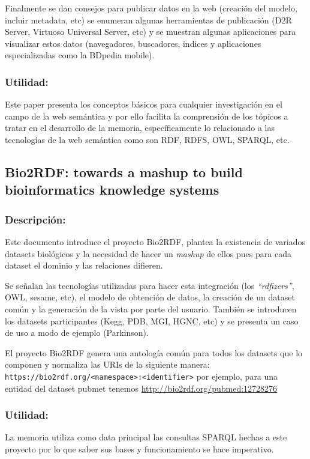 \documentclass[spanish, fleqn]{article}
\begin{document}
Finalmente se dan consejos para publicar datos en la web (creación del modelo,
incluir metadata, etc) se enumeran algunas herramientas de publicación (D2R
Server, Virtuoso Universal Server, etc) y se muestran algunas aplicaciones para
visualizar estos datos (navegadores, buscadores, indices y aplicaciones
especializadas como la BDpedia mobile).

\subsubsection*{Utilidad:}
Este paper presenta los conceptos básicos para cualquier investigación en el
campo de la web semántica y por ello facilita la comprensión de los tópicos a
tratar en el desarrollo de la memoria, específicamente lo relacionado a las
tecnologías de la web semántica como son RDF, RDFS, OWL, SPARQL, etc.

\newpage {}

\subsection{Bio2RDF: towards a mashup to build bioinformatics knowledge systems\cite{belleau2008bio2rdf}}
\subsubsection*{Descripción:}
Este documento introduce el proyecto Bio2RDF, plantea la existencia de variados
datasets biológicos y la necesidad de hacer un \emph{mashup} de ellos pues para
cada dataset el dominio y las relaciones difieren.

Se señalan las tecnologías utilizadas para hacer esta integración (los
\emph{``rdfizers''}, OWL, sesame, etc), el modelo de obtención de datos, la
creación de un dataset común y la generación de la vista por parte del usuario.
También se introducen los datasets participantes (Kegg, PDB, MGI, HGNC, etc) y
se presenta un caso de uso a modo de ejemplo (Parkinson).

El proyecto Bio2RDF genera una antología común para todos los datasets que lo
componen y normaliza las URIs de la siguiente manera: 
\texttt{https://bio2rdf.org/<namespace>:<identifier>} por ejemplo, para una
entidad del dataset pubmet tenemos \url{http://bio2rdf.org/pubmed:12728276}

\subsubsection*{Utilidad:}
La memoria utiliza como data principal las consultas SPARQL hechas a este
proyecto por lo que saber sus bases y funcionamiento se hace imperativo.
\end{document}
